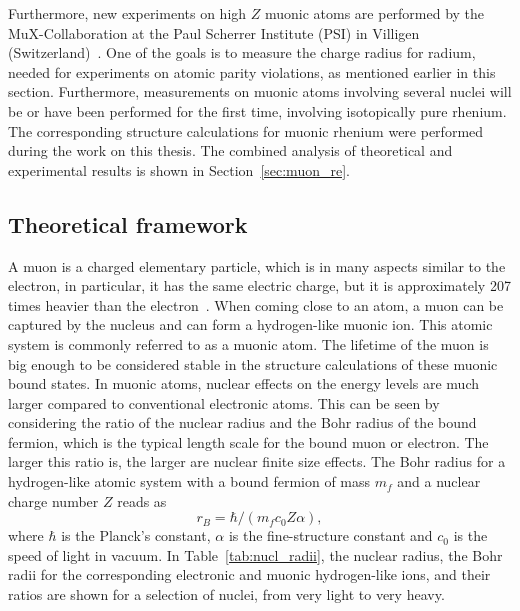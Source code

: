 Furthermore, new experiments on high $Z$ muonic atoms are performed by the MuX-Collaboration at the Paul Scherrer Institute (PSI) in Villigen (Switzerland)~\cite[p. 3]{kirch2016}. One of the goals is to measure the charge radius for radium, needed for experiments on atomic parity violations, as mentioned earlier in this section. Furthermore, measurements on muonic atoms involving several nuclei will be or have been performed for the first time, involving isotopically pure rhenium. The corresponding structure calculations for muonic rhenium were performed during the work on this thesis. The combined analysis of theoretical and experimental results is shown in Section~\ref{sec:muon_re}.

\subsection{Theoretical framework}
\label{sec:muon_framework}
A muon is a charged elementary particle, which is in many aspects similar to the electron, in particular, it has the same electric charge, but it is approximately 207 times heavier than the electron~\cite{codata}. When coming close to an atom, a muon can be captured by the nucleus and can form a hydrogen-like muonic ion. This atomic system is commonly referred to as a muonic atom. The lifetime of the muon is big enough to be considered stable in the structure calculations of these muonic bound states.
In muonic atoms, nuclear effects on the energy levels are much larger compared to conventional electronic atoms. This can be seen by considering the ratio of the nuclear radius and the Bohr radius of the bound fermion, which is the typical length scale for the bound muon or electron. The larger this ratio is, the larger are nuclear finite size effects. The Bohr radius for a hydrogen-like atomic system with a bound fermion of mass $m_f$ and a nuclear charge number $Z$ reads as
\begin{equation}
r_B = \hbar / (m_f c_0 Z \alpha),
\end{equation}
where $\hbar$ is the Planck's constant, $\alpha$ is the fine-structure constant and $c_0$ is the speed of light in vacuum. In Table~\ref{tab:nucl_radii}, the nuclear radius, the Bohr radii for the corresponding electronic and muonic hydrogen-like ions, and their ratios are shown for a selection of nuclei, from very light to very heavy.
%
%
